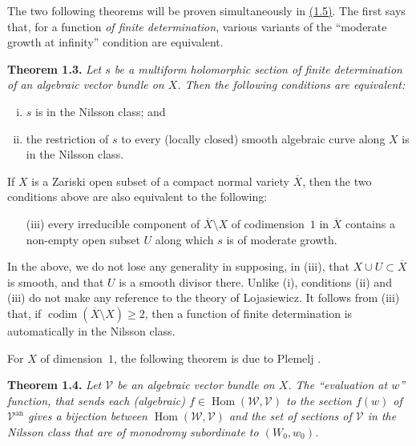 \documentclass{report}
\newenvironment{itenv}[1]
  {\phantomsection\par\medskip\noindent\textbf{#1.}\itshape}
  {\par\medskip}
\newcommand{\scr}[1]{{\mathscr{#1}}}
\renewcommand{\cal}[1]{{\mathcal{#1}}}
\newcommand{\an}{\mathrm{an}}
\renewcommand{\geq}{\geqslant}
\DeclareMathOperator{\Hom}{Hom}
\DeclareMathOperator{\codim}{codim}
\newcommand{\oldpage}[1]{\marginpar{\footnotesize$\Big\vert$ \textit{p.~#1}}}
\begin{document}
The two following theorems will be proven simultaneously in \hyperref[III.1.5proof]{(1.5)}.
The first says that, for a function \emph{of finite determination}, various variants of the ``moderate growth at infinity'' condition are equivalent.

\begin{itenv}{Theorem 1.3}
\label{III.1.3}
  Let $s$ be a multiform holomorphic section of finite determination of an algebraic vector bundle on $X$.
  Then the following conditions are equivalent:
  \begin{enumerate}[(i)]
    \item $s$ is in the Nilsson class; and
    \item the restriction of $s$ to every (locally closed) smooth algebraic curve along $X$ is in the Nilsson class.
  \end{enumerate}
\oldpage{123}
  If $X$ is a Zariski open subset of a compact normal variety $\overline{X}$, then the two conditions above are also equivalent to the following:
  \begin{enumerate}
    \item[{\rm(iii)}] every irreducible component of $\overline{X}\setminus X$ of codimension~$1$ in $\overline{X}$ contains a non-empty open subset $U$ along which $s$ is of moderate growth.
  \end{enumerate}
\end{itenv}

In the above, we do not lose any generality in supposing, in (iii), that $X\cup U\subset\overline{X}$ is smooth, and that $U$ is a smooth divisor there.
Unlike (i), conditions (ii) and (iii) do not make any reference to the theory of Lojasiewicz.
It follows from (iii) that, if $\codim(\overline{X}\setminus X)\geq2$, then a function of finite determination is automatically in the Nilsson class.

For $X$ of dimension~$1$, the following theorem is due to Plemelj \cite{23}.

\begin{itenv}{Theorem 1.4}
\label{III.1.4}
  Let $\cal{V}$ be an algebraic vector bundle on $X$.
  The ``evaluation at $w$'' function, that sends each (algebraic) $f\in\Hom(\scr{W},\cal{V})$ to the section $f(w)$ of $\cal{V}^\an$ gives a bijection between $\Hom(\scr{W},\cal{V})$ and the set of sections of $\cal{V}$ in the Nilsson class that are of monodromy subordinate to $(W_0,w_0)$.
\end{itenv}
\end{document}
